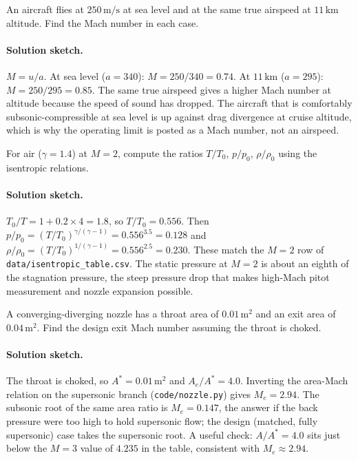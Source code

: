 \begin{exercise}
An aircraft flies at $250\,\si{\meter\per\second}$ at sea level and
at the same true airspeed at $11\,\si{\kilo\meter}$ altitude. Find
the Mach number in each case.
\paragraph{Solution sketch.} $M = u/a$. At sea level
($a = 340$): $M = 250/340 = 0.74$. At $11\,\si{\kilo\meter}$
($a = 295$): $M = 250/295 = 0.85$. The same true airspeed gives a
higher Mach number at altitude because the speed of sound has
dropped. The aircraft that is comfortably subsonic-compressible at
sea level is up against drag divergence at cruise altitude, which is
why the operating limit is posted as a Mach number, not an airspeed.
\end{exercise}

\begin{exercise}
For air ($\gamma = 1.4$) at $M = 2$, compute the ratios $T/T_0$,
$p/p_0$, $\rho/\rho_0$ using the isentropic relations.
\paragraph{Solution sketch.} $T_0/T = 1 + 0.2\times 4 = 1.8$, so
$T/T_0 = 0.556$. Then $p/p_0 = (T/T_0)^{\gamma/(\gamma-1)} =
0.556^{3.5} = 0.128$ and $\rho/\rho_0 = (T/T_0)^{1/(\gamma-1)} =
0.556^{2.5} = 0.230$. These match the $M = 2$ row of
\texttt{data/isentropic\_table.csv}. The static pressure at $M = 2$ is
about an eighth of the stagnation pressure, the steep pressure drop
that makes high-Mach pitot measurement and nozzle expansion possible.
\end{exercise}

\begin{exercise}
A converging-diverging nozzle has a throat area of $0.01\,\si{
\meter}^2$ and an exit area of $0.04\,\si{\meter}^2$. Find the
design exit Mach number assuming the throat is choked.
\paragraph{Solution sketch.} The throat is choked, so $A^* =
0.01\,\si{\meter}^2$ and $A_e/A^* = 4.0$. Inverting the area-Mach
relation on the supersonic branch (\texttt{code/nozzle.py}) gives
$M_e = 2.94$. The subsonic root of the same area ratio is
$M_e = 0.147$, the answer if the back pressure were too high to hold
supersonic flow; the design (matched, fully supersonic) case takes the
supersonic root. A useful check: $A/A^* = 4.0$ sits just below the
$M = 3$ value of $4.235$ in the table, consistent with $M_e \approx
2.94$.
\end{exercise}

